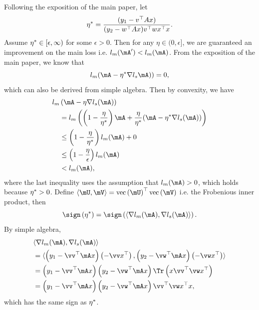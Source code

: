 {\lemma \label{lemma_lr}
Following the exposition of the main paper, let
\begin{equation}
\eta^*  = \frac{(y_1 - v^\top A x)}{(y_2 - w^\top A x) v^\top w x^\top x}.
\end{equation}
Assume $\eta^* \in [\epsilon, \infty)$ for some $\epsilon > 0$.
Then for any $\eta \in (0, \epsilon]$,
we are guaranteed an improvement on the main loss i.e. $l_m(\mA') < l_m(\mA)$.
}
{\proof
From the exposition of the main paper, we know that
$$l_m(\mA - \eta\opt \grad l_s\mA)) = 0,$$
which can also be derived from simple algebra.
Then by convexity, we have
\begin{align}
l_m&\paren{\mA - \eta \grad l_s(\mA)}\\
&= l_m\paren{\paren{1 - \frac{\eta}{\eta\opt}} \mA 
	+ \frac{\eta}{\eta\opt}(\mA - \eta\opt \grad l_s(\mA))}  \\
&\leq \paren{1 - \frac{\eta}{\eta\opt}} l_m(\mA) + 0 \\
&\leq \paren{1 - \frac{\eta}{\epsilon}} l_m(\mA)\\
&< l_m(\mA),
\end{align}
where the last inequality uses the assumption that $l_m(\mA)>0$, which holds
because $\eta^* > 0$.}
{\lemma \label{lemma_sign}
Define
$\langle \mU, \mV \rangle
= \text{vec} \left(\mU\right)^\top \text{vec} \left(\mV \right)$ 
i.e. the Frobenious inner product, then
\begin{equation}
\sign \left(\eta\opt\right) = \sign \left(\langle \grad l_m(\mA), \grad l_s(\mA)\rangle\right).
\end{equation}
}
{\proof By simple algebra,
\begin{align*}
&\langle\grad  l_m(\mA), \grad l_s(\mA)\rangle \\
&= 
    \langle\left( y_1-\vv^\top \mA x \right)\left(-\vv x^\top \right),
    \left( y_2-\vw^\top \mA x \right)\left(-\vw x^\top \right)\rangle\\
&= \left( y_1-\vv^\top \mA x \right)\left( y_2-\vw^\top \mA x \right)
\Tr \left( x \vv^\top \vw x^\top \right)\\
&= \left( y_1-\vv^\top\mA x \right)\left( y_2-\vw^\top\mA x \right) 
\vv^\top \vw x^\top x,
\end{align*}
}
which has the same sign as $\eta^*$.

